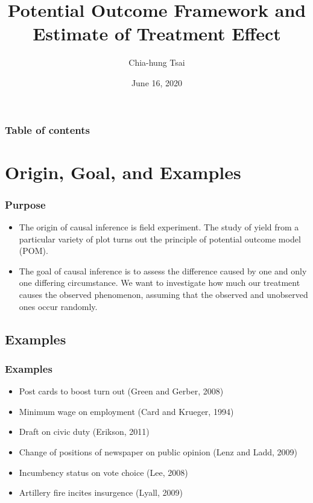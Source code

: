 \documentclass[xcolor=dvipsnames]{beamer}
\newenvironment{reference}[2]{%
  \begin{textblock*}{\textwidth}(#1,#2)
      \footnotesize\sf\bgroup\color{red!50!black}}{\egroup\end{textblock*}}
\begin{document}
  
\title[POM and ATE]{Potential Outcome Framework and Estimate of Treatment Effect}
\author[CHT]{Chia-hung Tsai}
\date[6/16/2020]{June 16, 2020} 

\begin{frame}
\titlepage
\end{frame}

\begin{frame}\frametitle{Table of contents}\tableofcontents
\end{frame} 


\section{Origin, Goal, and Examples} 
\begin{frame}\frametitle{Purpose} 
\begin{itemize}
\item The origin of causal inference is field experiment. The study of yield from a particular variety of plot turns out the principle of potential outcome model (POM).
\item The goal of causal inference is to assess the difference caused by one and only one differing circumstance. We want to investigate  how much our treatment causes the observed phenomenon, assuming that the observed and unobserved ones occur randomly. 
\end{itemize}
\end{frame}
\subsection{Examples }
\begin{frame} \frametitle{Examples}
\begin{itemize}
\item Post cards to boost turn out (Green and Gerber, 2008)
\item Minimum wage on employment (Card and Krueger, 1994)
\item Draft on civic duty (Erikson, 2011)
\item Change of positions of newspaper on public opinion (Lenz and Ladd, 2009)
\item Incumbency status on vote choice (Lee, 2008)
\item Artillery fire incites insurgence (Lyall, 2009)
\end{itemize}
\end{frame}
\end{document}
